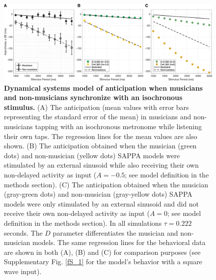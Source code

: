 \documentclass{report}
\begin{document}
\begin{figure}
    \centering
    \includegraphics[width=1.0\textwidth]{figures/fig2_2.png}
    \caption[Dynamical systems model of anticipation when musicians and non-musicians synchronize with an isochronous stimulus]{\textbf{Dynamical systems model of anticipation when musicians and non-musicians synchronize with an isochronous stimulus.} (A) The anticipation (mean values with error bars representing the standard error of the mean) in musicians and non-musicians tapping with an isochronous metronome while listening their own taps. The regression lines for the mean values are also shown. (B) The anticipation obtained when the musician (green dots) and non-musician (yellow dots) SAPPA models were stimulated by an external sinusoid while also receiving their own non-delayed activity as input ($A = -0.5$; see model definition in the methods section). (C) The anticipation obtained when the musician (gray-green dots) and non-musician (gray-yellow dots) SAPPA models were only stimulated by an external sinusoid and did not receive their own non-delayed activity as input ($A = 0$; see model definition in the methods section). In all simulations $\tau = 0.222$ seconds. The $D$ parameter differentiates the musician and non-musician models. The same regression lines for the behavioral data are shown in both (A), (B) and (C) for comparison purposes (see Supplementary Fig.{} \ref{fS_1} for the model's behavior with a square wave input).}
    \label{f2_2}
\end{figure}
\end{document}
